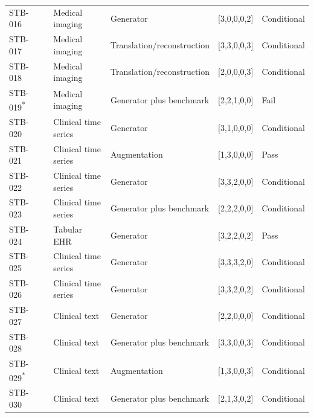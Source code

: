 \begin{longtable}{P{1.1cm}P{3.0cm}P{2.6cm}P{3.8cm}P{1.8cm}P{2.2cm}}
STB-016 & \citealp{pinaya2022brainldm} & Medical imaging & Generator & [3,0,0,0,2] & Conditional \\
STB-017 & \citealp{carrilloperez2024rnacdm} & Medical imaging & Translation/reconstruction & [3,3,0,0,3] & Conditional \\
STB-018 & \citealp{zanier2024tomoray} & Medical imaging & Translation/reconstruction & [2,0,0,0,3] & Conditional \\
STB-019\textsuperscript{*} & \citealp{alimozzaman2025imaging} & Medical imaging & Generator plus benchmark & [2,2,1,0,0] & Fail \\
STB-020 & \citealp{yoon2019timegan} & Clinical time series & Generator & [3,1,0,0,0] & Conditional \\
STB-021 & \citealp{golany2019pgans} & Clinical time series & Augmentation & [1,3,0,0,0] & Pass \\
STB-022 & \citealp{biswal2021eva} & Clinical time series & Generator & [3,3,2,0,0] & Conditional \\
STB-023 & \citealp{ashrafi2023ppgan} & Clinical time series & Generator plus benchmark & [2,2,2,0,0] & Conditional \\
STB-024 & \citealp{naseer2023scoehr} & Tabular EHR & Generator & [3,2,2,0,2] & Pass \\
STB-025 & \citealp{yoon2023ehrsafe} & Clinical time series & Generator & [3,3,3,2,0] & Conditional \\
STB-026 & \citealp{tian2024timediff} & Clinical time series & Generator & [3,3,2,0,2] & Conditional \\
STB-027 & \citealp{mawaldi2024llama2thesis} & Clinical text & Generator & [2,2,0,0,0] & Conditional \\
STB-028 & \citealp{xu2024clingen} & Clinical text & Generator plus benchmark & [3,3,0,0,3] & Conditional \\
STB-029\textsuperscript{*} & \citealp{hu2025clinicalie} & Clinical text & Augmentation & [1,3,0,0,3] & Conditional \\
STB-030 & \citealp{miranda2024spanishdp} & Clinical text & Generator plus benchmark & [2,1,3,0,2] & Conditional \\
\bottomrule
\end{longtable}

